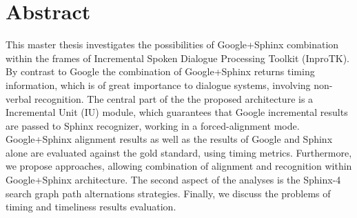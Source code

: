\chapter*{Abstract}
This master thesis investigates the possibilities of Google+Sphinx combination within the frames of Incremental Spoken Dialogue 
Processing Toolkit (InproTK). By contrast to Google the combination of
Google+Sphinx returns timing information, which is of great importance to
dialogue systems, involving non-verbal recognition. The central part of the the
proposed architecture is a Incremental Unit (IU) module, which guarantees that Google incremental results are passed to 
Sphinx recognizer, working in a forced-alignment mode. Google+Sphinx alignment results as well as the results of
Google and Sphinx alone are evaluated against the gold standard, using
timing metrics. Furthermore, we propose approaches, allowing combination of
alignment and recognition within  Google+Sphinx architecture. The second aspect
of the analyses is the Sphinx-4 search graph path alternations strategies.
Finally, we discuss the problems of timing and timeliness results evaluation.

